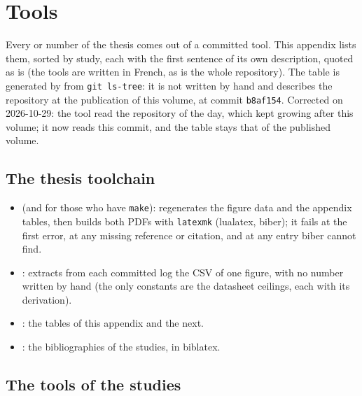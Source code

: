 \chapter{Tools}\label{ann:outils}

Every \mes{} or \calc{} number of the thesis comes out of a committed tool. This appendix lists them, sorted by study, each with the first sentence of its own description, quoted as is (the tools are written in French, as is the whole repository). The table is generated by  from  \texttt{git ls-tree}: it is not written by hand and  describes the repository at the publication of this volume, at commit \texttt{b8af154}. Corrected on 2026-10-29: the tool read the repository of the day, which kept growing after this volume; it now reads this commit, and the table stays that of the published volume.

\section{The thesis toolchain}

\begin{itemize}
\item {} (and  for those who have \texttt{make}): regenerates the figure data and the appendix tables, then builds both PDFs with \texttt{latexmk} (lualatex, biber); it fails at the first error, at any missing reference or citation, and at any entry biber cannot find.
\item {}: extracts from each committed log the CSV of one figure, with no number written by hand (the only constants are the datasheet ceilings, each with its derivation).
\item {}: the tables of this appendix and the next.
\item {}: the bibliographies of the studies, in biblatex.
\end{itemize}

\section{The tools of the studies}


